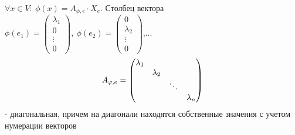     $\forall x \in V: \ \phi(x) = A_{\phi,e}\cdot X_e$. Столбец вектора $\phi(e_1) = \left(\begin{smallmatrix}
        \lambda_1 \\ 0 \\ \vdots \\ 0
    \end{smallmatrix}\right), \ \phi(e_2) = \left(\begin{smallmatrix}
        0 \\ \lambda_2 \\ \vdots \\ 0
    \end{smallmatrix}\right)$,...
    $$A_{\phi, e} = \begin{pmatrix}
        \lambda_1 & \null & \null & \null \\
        \null & \lambda_2 & \null & \null \\
        \null & \null & \ddots & \null\\
        \null & \null & \null & \lambda_n
    \end{pmatrix}$$
    - диагональная, причем на диагонали находятся собственные значения с учетом нумерации векторов
